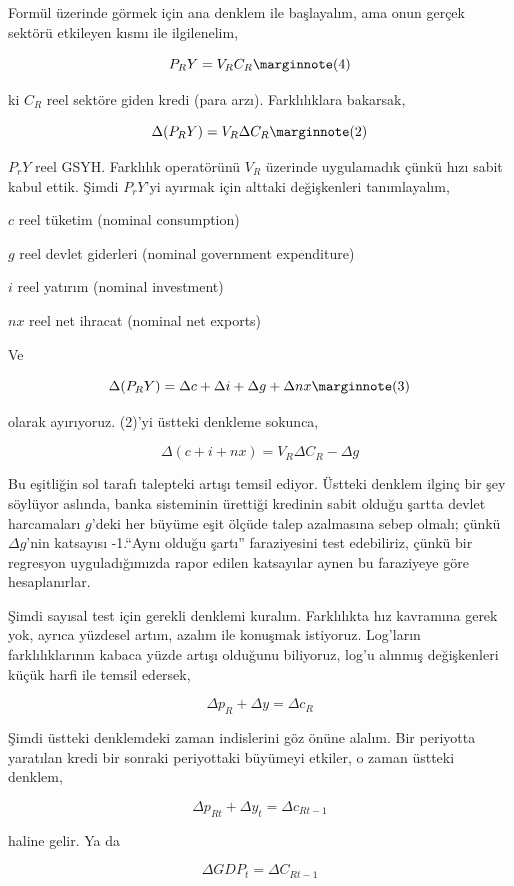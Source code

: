 \documentclass[12pt,fleqn]{article}\usepackage{../../common}
\begin{document}
Formül üzerinde görmek için ana denklem ile başlayalım, ama onun gerçek
sektörü etkileyen kısmı ile ilgilenelim,

$$ 
P_R Y = V_R C_R 
\mlabel{4}
$$

ki $C_R$ reel sektöre giden kredi (para arzı). Farklılıklara bakarsak, 

$$ 
\Delta (P_R Y) = V_R \Delta C_R 
\mlabel{2}
$$

$P_rY$ reel GSYH. Farklılık operatörünü $V_R$ üzerinde uygulamadık çünkü
hızı sabit kabul ettik. Şimdi $P_rY$'yi ayırmak için alttaki değişkenleri
tanımlayalım,

$c$ reel tüketim (nominal consumption)

$g$ reel devlet giderleri (nominal government expenditure)

$i$ reel yatırım (nominal investment)

$nx$ reel net ihracat (nominal net exports)

Ve

$$ 
\Delta (P_RY) = \Delta c + \Delta i + \Delta g + \Delta nx 
\mlabel{3}
$$ 

olarak ayırıyoruz. (2)'yi üstteki denkleme sokunca, 

$$ \Delta (c +  i +  nx) = V_R\Delta C_R - \Delta g$$

Bu eşitliğin sol tarafı talepteki artışı temsil ediyor. Üstteki denklem
ilginç bir şey söylüyor aslında, banka sisteminin ürettiği kredinin sabit
olduğu şartta devlet harcamaları $g$'deki her büyüme eşit ölçüde talep
azalmasına sebep olmalı; çünkü $\Delta g$'nin katsayısı -1.``Aynı olduğu
şartı'' faraziyesini test edebiliriz, çünkü bir regresyon uyguladığımızda
rapor edilen katsayılar aynen bu faraziyeye göre hesaplanırlar. 

Şimdi sayısal test için gerekli denklemi kuralım. Farklılıkta hız
kavramına gerek yok, ayrıca yüzdesel artım, azalım ile konuşmak
istiyoruz. Log'ların farklılıklarının kabaca yüzde artışı olduğunu
biliyoruz, log'u alınmış değişkenleri küçük harfi ile temsil edersek, 

$$ \Delta p_R + \Delta y = \Delta c_R$$

Şimdi üstteki denklemdeki zaman indislerini göz önüne alalım. Bir periyotta
yaratılan kredi bir sonraki periyottaki büyümeyi etkiler, o zaman üstteki
denklem,

$$ \Delta p_{Rt} + \Delta y_{t} = \Delta c_{Rt-1}$$

haline gelir. Ya da 

$$ \Delta GDP_t = \Delta C_{Rt-1}$$
\end{document}
